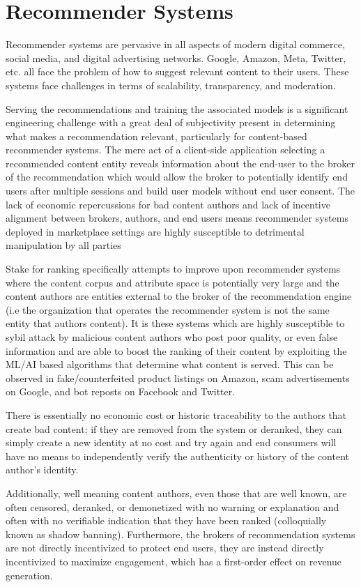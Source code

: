 \section{Recommender Systems}

Recommender systems are pervasive in all aspects of modern digital commerce, social media, and digital advertising networks. Google, Amazon, Meta, Twitter, etc. all face the problem of how to suggest relevant content to their users. These systems face challenges in terms of scalability, transparency, and moderation. 

Serving the recommendations and training the associated models is a significant engineering challenge with a great deal of subjectivity present in determining what makes a recommendation relevant, particularly for content-based recommender systems. The mere act of a client-side application selecting a recommended content entity reveals information about the end-user to the broker of the recommendation which would allow the broker to potentially identify end users after multiple sessions and build user models without end user consent. The lack of economic repercussions for bad content authors and lack of incentive alignment between brokers, authors, and end users means recommender systems deployed in marketplace settings are highly susceptible to detrimental manipulation by all parties

Stake for ranking specifically attempts to improve upon recommender systems where the content corpus and attribute space is potentially very large and the content authors are entities external to the broker of the recommendation engine (i.e the organization that operates the recommender system is not the same entity that authors content). It is these systems which are highly susceptible to sybil attack by malicious content authors who post poor quality, or even false information and are able to boost the ranking of their content by exploiting the ML/AI based algorithms that determine what content is served. This can be observed in fake/counterfeited product listings on Amazon, scam advertisements on Google, and bot reposts on Facebook and Twitter. 

There is essentially no economic cost or historic traceability to the authors that create bad content; if they are removed from the system or deranked, they can simply create a new identity at no cost and try again and end consumers will have no means to independently verify the authenticity or history of the content author's identity. 

Additionally, well meaning content authors, even those that are well known, are often censored, deranked, or demonetized with no warning or explanation and often with no verifiable indication that they have been ranked (colloquially known as shadow banning). Furthermore, the brokers of recommendation systems are not directly incentivized to protect end users, they are instead directly incentivized to maximize engagement, which has a first-order effect on revenue generation. 
